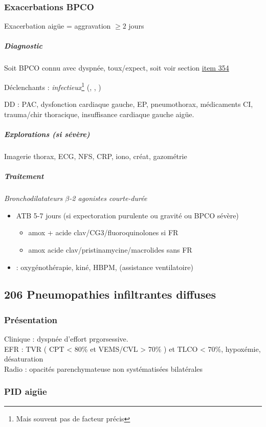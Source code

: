 \documentclass[11pt]{article}
\begin{document}
\subsubsection{Exacerbations BPCO}
\label{sec:org77c76f8}
Exacerbation aigüe = aggravation \(\ge 2\) jours
\subparagraph{Diagnostic}
\label{sec:org98e4c08}
Soit BPCO connu avec \inc dyspnée, toux/expect, soit voir section \hyperref[org7752461]{item 354}

Déclenchants : \emph{infectieux}\footnote{Mais souvent pas de facteur précis} 
(, , )

DD : PAC, dysfonction cardiaque gauche, EP, pneumothorax, médicaments CI, trauma/chir thoracique, insuffisance cardiaque gauche aigüe.

\subparagraph{Explorations (si sévère)}
\label{sec:orgab229aa}
Imagerie thorax, ECG, NFS, CRP, iono, créat, gazométrie

\subparagraph{Traitement}
\label{sec:orgeab49af}
\emph{Bronchodilatateurs \(\beta\)-2 agonistes courte-durée} 
\begin{itemize}
\item \textpm{} ATB 5-7 jours (si expectoration
purulente ou gravité ou BPCO sévère) 
\begin{itemize}
\item amox + acide clav/CG3/fluoroquinolones si FR
\item amox \textpm{} acide clav/pristinamycine/macrolides sans FR
\end{itemize}
\item \faHospital : oxygénothérapie, kiné, HBPM, (assistance ventilatoire)
\end{itemize}

\subsection{206 \textdagger{} Pneumopathies infiltrantes diffuses}
\label{sec:orga170edf}
\subsubsection{Présentation}
\label{sec:orgb025018}
Clinique : dyspnée d'effort prgorsessive.\\
EFR : \gls{TVR} ( CPT < 80\% et VEMS/CVL >
70\% ) et TLCO < 70\%, hypoxémie, désaturation\\
Radio : opacités parenchymateuse non systématisées bilatérales

\subsubsection{PID aigüe}
\label{sec:orgd24fcc5}
\end{document}
